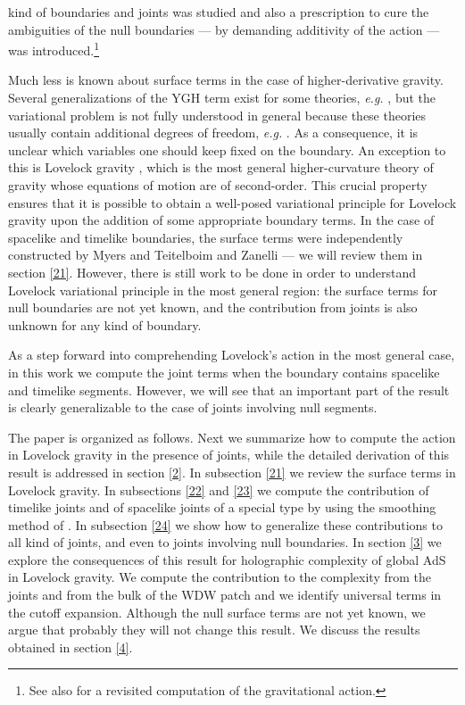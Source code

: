 \documentclass[11pt,letterpaper]{article}
\begin{document}
kind of boundaries and joints was studied and also a prescription to cure the ambiguities of the null boundaries --- by demanding additivity of the action --- was introduced.\footnote{See also \cite{Jubb:2016qzt} for a revisited computation of the gravitational action.}

Much less is known about surface terms in the case of higher-derivative gravity. Several generalizations of the YGH term exist for some theories, \textit{e.g.} \cite{Smolic:2013gz,Madsen:1989rz,Dyer:2008hb,Guarnizo:2010xr,Love,Deruelle:2009zk,Teimouri:2016ulk,Bueno:2018xqc}, but the variational problem is not fully understood in general because these theories usually contain additional degrees of freedom, \textit{e.g.} \cite{Prue,Tekin1,Aspects}. As a consequence, it is unclear which variables one should keep fixed on the boundary. An exception to this is Lovelock gravity \cite{Lovelock1,Lovelock2}, which is the most general higher-curvature theory of gravity whose equations of motion are of second-order. This crucial property ensures that it is possible to obtain a well-posed variational principle for Lovelock gravity upon the addition of some appropriate boundary terms. In the case of spacelike and timelike boundaries, the surface terms were independently constructed by Myers \cite{Myers:1987yn} and Teitelboim and Zanelli \cite{Teitelboim:1987zz} --- we will review them in section \ref{21}. However, there is still work to be done in order to understand Lovelock variational principle in the most general region: the surface terms for null boundaries are not yet known, and the contribution from joints is also unknown for any kind of boundary.

As a step forward into comprehending Lovelock's action in the most general case, in this work we compute the joint terms when the boundary contains spacelike and timelike segments. However, we will see that an important part of the result is clearly generalizable to the case of joints involving null segments. 

The paper is organized as follows. Next we summarize how to compute the action in Lovelock gravity in the presence of joints, while the detailed derivation of this result is addressed in section \ref{2}. In subsection \ref{21} we review the surface terms in Lovelock gravity. In subsections \ref{22} and \ref{23} we compute the contribution of timelike joints and of spacelike joints of a special type by using the smoothing method of \cite{Hayward:1993my}. In subsection \ref{24} we show how to generalize these contributions to all kind of joints, and even to joints involving null boundaries. In section \ref{3} we explore the consequences of this result for holographic complexity of global AdS in Lovelock gravity. We compute the contribution to the complexity from the joints and from the bulk of the WDW patch and we identify universal terms in the cutoff expansion. Although the null surface terms are not yet known, we argue that probably they will not change this result. We discuss the results obtained in section \ref{4}.
\end{document}
